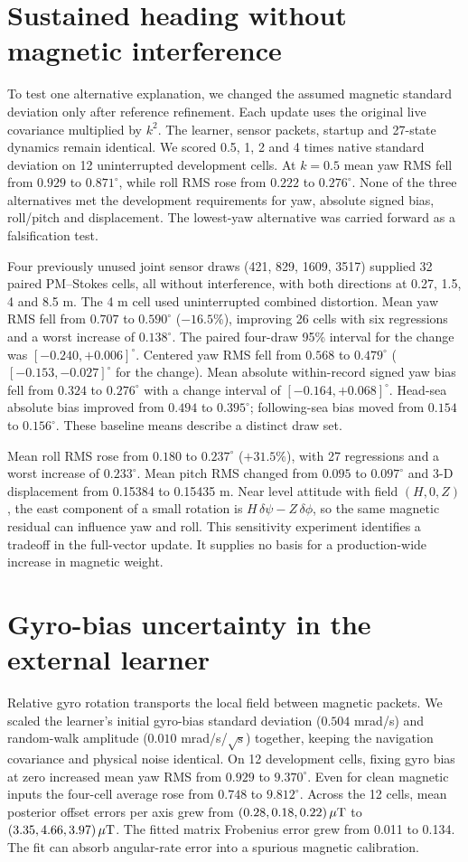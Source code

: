 \section{Sustained heading without magnetic interference}
To test one alternative explanation, we changed the assumed magnetic standard deviation only after reference refinement. Each update uses the original live covariance multiplied by $k^2$. The learner, sensor packets, startup and 27-state dynamics remain identical. We scored 0.5, 1, 2 and 4 times native standard deviation on 12 uninterrupted development cells. At $k=0.5$ mean yaw RMS fell from $0.929$ to $0.871^\circ$, while roll RMS rose from $0.222$ to $0.276^\circ$. None of the three alternatives met the development requirements for yaw, absolute signed bias, roll/pitch and displacement. The lowest-yaw alternative was carried forward as a falsification test.

Four previously unused joint sensor draws (421, 829, 1609, 3517) supplied 32 paired PM--Stokes cells, all without interference, with both directions at 0.27, 1.5, 4 and 8.5 m. The 4 m cell used uninterrupted combined distortion. Mean yaw RMS fell from $0.707$ to $0.590^\circ$ ($-16.5\%$), improving 26 cells with six regressions and a worst increase of $0.138^\circ$. The paired four-draw 95\% interval for the change was $[-0.240,+0.006]^\circ$. Centered yaw RMS fell from $0.568$ to $0.479^\circ$ ($[-0.153,-0.027]^\circ$ for the change). Mean absolute within-record signed yaw bias fell from $0.324$ to $0.276^\circ$ with a change interval of $[-0.164,+0.068]^\circ$. Head-sea absolute bias improved from $0.494$ to $0.395^\circ$; following-sea bias moved from $0.154$ to $0.156^\circ$. These baseline means describe a distinct draw set.

Mean roll RMS rose from $0.180$ to $0.237^\circ$ ($+31.5\%$), with 27 regressions and a worst increase of $0.233^\circ$. Mean pitch RMS changed from $0.095$ to $0.097^\circ$ and 3-D displacement from 0.15384 to 0.15435 m. Near level attitude with field $(H,0,Z)$, the east component of a small rotation is $H\,\delta\psi-Z\,\delta\phi$, so the same magnetic residual can influence yaw and roll. This sensitivity experiment identifies a tradeoff in the full-vector update. It supplies no basis for a production-wide increase in magnetic weight.


\section{Gyro-bias uncertainty in the external learner}
Relative gyro rotation transports the local field between magnetic packets. We scaled the learner's initial gyro-bias standard deviation ($0.504$ mrad/s) and random-walk amplitude ($0.010$ mrad/s/$\sqrt{\mathrm s}$) together, keeping the navigation covariance and physical noise identical. On 12 development cells, fixing gyro bias at zero increased mean yaw RMS from $0.929$ to $9.370^\circ$. Even for clean magnetic inputs the four-cell average rose from $0.748$ to $9.812^\circ$. Across the 12 cells, mean posterior offset errors per axis grew from $(0.28,0.18,0.22)\,\mu\mathrm T$ to $(3.35,4.66,3.97)\,\mu\mathrm T$. The fitted matrix Frobenius error grew from 0.011 to 0.134. The fit can absorb angular-rate error into a spurious magnetic calibration.

